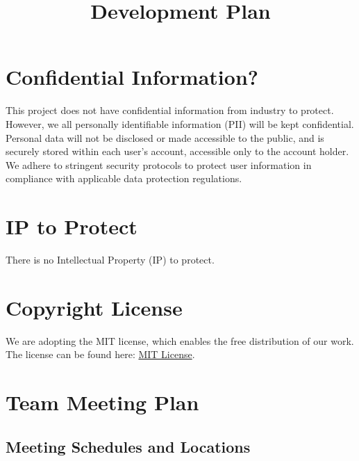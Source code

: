 \documentclass{article}
\title{Development Plan}
\date{}
\begin{document}
\maketitle

\section{Confidential Information?}
This project does not have confidential information from industry to protect. However, we all personally identifiable information (PII) will be kept confidential. Personal data will not be disclosed or made accessible to the public, and is securely stored within each user's account, accessible only to the account holder. We adhere to stringent security protocols to protect user information in compliance with applicable data protection regulations.

\section{IP to Protect}
There is no Intellectual Property (IP) to protect.

\section{Copyright License}
We are adopting the MIT license, which enables the free distribution of our work. The license can be found here: \href{https://github.com/PlutosCapstone/Plutos/blob/main/LICENSE}{MIT License}.

\section{Team Meeting Plan}

\subsection{Meeting Schedules and Locations}
\end{document}
